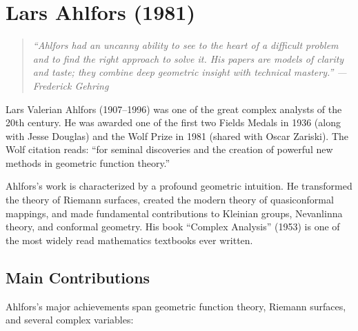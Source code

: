 \let\im\relax
\newcommand{\im}{\operatorname{im}}
\let\Area\relax
\newcommand{\Area}{\operatorname{Area}}
\let\diam\relax
\newcommand{\diam}{\operatorname{diam}}
\let\Mod\relax
\newcommand{\Mod}{\operatorname{Mod}}
\let\Teich\relax
\newcommand{\Teich}{\operatorname{Teich}}
\let\Bel\relax
\newcommand{\Bel}{\operatorname{Bel}}
\let\N\relax
\newcommand{\N}{\mathbb{N}}
\let\R\relax
\newcommand{\R}{\mathbb{R}}
\let\C\relax
\newcommand{\C}{\mathbb{C}}
\let\Q\relax
\newcommand{\Q}{\mathbb{Q}}
\let\Z\relax
\newcommand{\Z}{\mathbb{Z}}
\let\D\relax
\newcommand{\D}{\mathbb{D}}
\let\HH\relax
\newcommand{\HH}{\mathbb{H}}
\let\cU\relax
\newcommand{\cU}{\mathcal{U}}

\chapter{Lars Ahlfors (1981)}

\begin{quote}
\it ``Ahlfors had an uncanny ability to see to the heart of a difficult problem and to find the right approach to solve it. His papers are models of clarity and taste; they combine deep geometric insight with technical mastery.'' --- Frederick Gehring
\end{quote}

Lars Valerian Ahlfors (1907--1996) was one of the great complex analysts of the 20th century. He was awarded one of the first two Fields Medals in 1936 (along with Jesse Douglas) and the Wolf Prize in 1981 (shared with Oscar Zariski). The Wolf citation reads: ``for seminal discoveries and the creation of powerful new methods in geometric function theory.''

Ahlfors's work is characterized by a profound geometric intuition. He transformed the theory of Riemann surfaces, created the modern theory of quasiconformal mappings, and made fundamental contributions to Kleinian groups, Nevanlinna theory, and conformal geometry. His book ``Complex Analysis'' (1953) is one of the most widely read mathematics textbooks ever written.

\section{Main Contributions}

Ahlfors's major achievements span geometric function theory, Riemann surfaces, and several complex variables:

